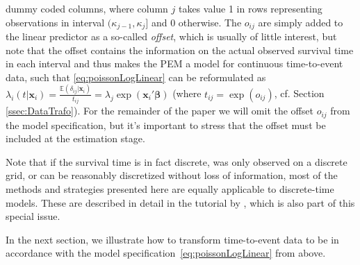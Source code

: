 \documentclass[submit]{smj}
\newcommand{\bfx}{\mathbf{x}}
\newcommand{\bsbeta}{\boldsymbol{\beta}}
\begin{document}
dummy coded columns, where column $j$ takes value 1 in rows representing observations in interval
$(\kappa_{j-1}, \kappa_{j}]$ and 0 otherwise.
The $o_{ij}$ are simply added to the linear predictor as a so-called \emph{offset},
which is usually of little interest, but note that the offset contains the
information on the actual observed survival time in each interval and thus
makes the PEM a model for continuous time-to-event data, such that
\eqref{eq:poissonLogLinear} can be reformulated as
$\lambda_i(t|\bfx_i)=\frac{\mathbb{E}(\delta_{ij}|\bfx_i)}{t_{ij}}=\lambda_j\exp(\bfx_i'\bsbeta)$
(where $t_{ij}=\exp(o_{ij})$, cf. Section \ref{ssec:DataTrafo}).
For the remainder of the paper we will omit the offset $o_{ij}$ from
the model specification, but it's important to stress that the offset must be
included at the estimation stage.

Note that if the survival time is in fact discrete, was only observed on a
discrete grid, or can be reasonably discretized without loss of information,
most of the methods and strategies presented here are equally applicable
to discrete-time models. These are described in detail in the tutorial by
\citet{BerSch:2017}, which is also part of this special issue.

In the next section, we illustrate how to transform time-to-event data
to be in accordance with the model specification~\eqref{eq:poissonLogLinear} from above.


\end{document}
